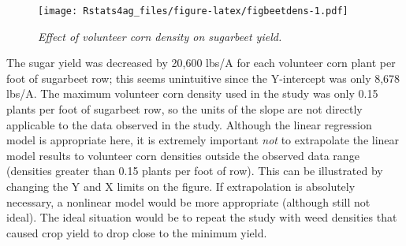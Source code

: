 \documentclass[letterpaper,]{book}
\newenvironment{Shaded}{\begin{snugshade}}{\end{snugshade}}
\newcommand{\CommentTok}[1]{\textcolor[rgb]{0.56,0.35,0.01}{\textit{#1}}}
\newcommand{\DataTypeTok}[1]{\textcolor[rgb]{0.13,0.29,0.53}{#1}}
\newcommand{\DecValTok}[1]{\textcolor[rgb]{0.00,0.00,0.81}{#1}}
\newcommand{\FloatTok}[1]{\textcolor[rgb]{0.00,0.00,0.81}{#1}}
\newcommand{\KeywordTok}[1]{\textcolor[rgb]{0.13,0.29,0.53}{\textbf{#1}}}
\newcommand{\NormalTok}[1]{#1}
\newcommand{\OperatorTok}[1]{\textcolor[rgb]{0.81,0.36,0.00}{\textbf{#1}}}
\newcommand{\StringTok}[1]{\textcolor[rgb]{0.31,0.60,0.02}{#1}}
\begin{document}
\begin{Shaded}
\end{Shaded}

\begin{figure}
\centering
\texttt{[image: Rstats4ag\_files/figure-latex/figbeetdens-1.pdf]}
\caption{\label{fig:figbeetdens}\emph{Effect of volunteer corn density on sugarbeet yield.}}
\end{figure}

The sugar yield was decreased by 20,600 lbs/A for each volunteer corn plant per foot of sugarbeet row; this seems unintuitive since the Y-intercept was only 8,678 lbs/A. The maximum volunteer corn density used in the study was only 0.15 plants per foot of sugarbeet row, so the units of the slope are not directly applicable to the data observed in the study. Although the linear regression model is appropriate here, it is extremely important \emph{not} to extrapolate the linear model results to volunteer corn densities outside the observed data range (densities greater than 0.15 plants per foot of row). This can be illustrated by changing the Y and X limits on the figure. If extrapolation is absolutely necessary, a nonlinear model would be more appropriate (although still not ideal). The ideal situation would be to repeat the study with weed densities that caused crop yield to drop close to the minimum yield.
\end{document}
